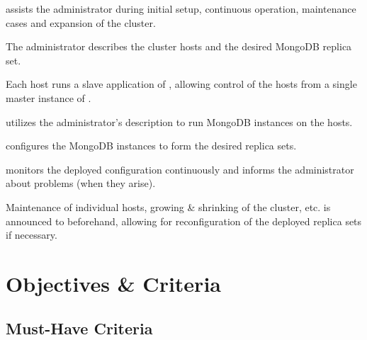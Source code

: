 \documentclass[a4paper, 11pt]{article}
\begin{document}
\mamid assists the \gls{administrator} during initial setup, continuous operation, maintenance cases and expansion of the cluster.

The \gls{administrator} describes the \gls{cluster} \glspl{host} and the desired \gls{MongoDB} \gls{replica set}.

Each \gls{host} runs a \gls{slave} application of \mamid, allowing control of the \glspl{host} from a single \gls{master} instance of \mamid.

\mamid utilizes the \gls{administrator}'s description to run \gls{MongoDB} instances on the \glspl{host}.

\mamid configures the \gls{MongoDB} instances to form the desired replica sets.

\mamid monitors the deployed configuration continuously and informs the \gls{administrator} about problems (when they arise).

Maintenance of individual \glspl{host}, growing \& shrinking of the cluster, etc. is announced to \mamid beforehand, allowing for reconfiguration of the deployed \glspl{replica set} if necessary.

\section{Objectives \& Criteria}
\subsection{Must-Have Criteria}
\end{document}
